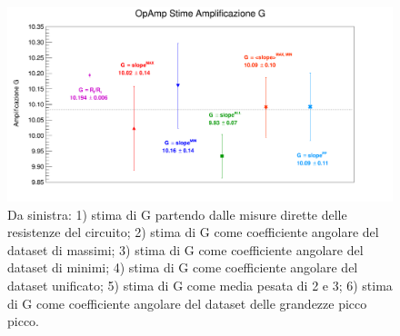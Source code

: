 \documentclass[a4paper,11pt]{article} %
\begin{document}
\begin{figure}[H]
	\centering
	\includegraphics[width=\linewidth]{../Plots/Report_Plots/opamp_comp.png}
	\caption{Da sinistra: 1) stima di G partendo dalle misure dirette delle resistenze del circuito;
	2) stima di G come coefficiente angolare del dataset di massimi; 3) stima di G come coefficiente 
	angolare del dataset di minimi; 4) stima di G come coefficiente angolare del dataset unificato; 
	5) stima di G come media pesata di 2 e 3; 6) stima di G come coefficiente angolare del dataset delle 
	grandezze picco picco.}
	\label{i:opamp_comp}
\end{figure}
\end{document}

